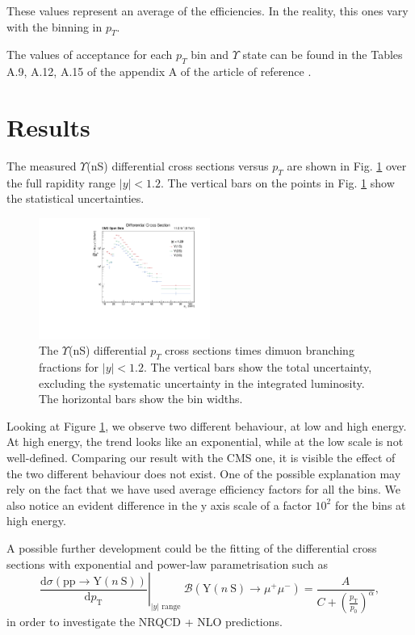 \documentclass[a4paper,11pt]{article}
\begin{document}
These values represent an average of the efficiencies. In the reality, this ones vary with the binning in $p_T$.

The values of acceptance for each $p_T$ bin and $\Upsilon$ state can be found in the Tables A.9, A.12, A.15 of the appendix A of the article of reference \cite{Khachatryan_2015}.

\section{Results}
The measured $\Upsilon$(nS) differential cross sections versus $p_T$ are shown in Fig. \ref{fig:diffcrosssec} over the full rapidity range $|y| < 1.2$. The vertical bars on the points in Fig. \ref{fig:diffcrosssec} show the statistical uncertainties.

\begin{figure}[h]
    \centering
    \includegraphics[width=0.5\textwidth]{diffCrossSection.pdf}
    \caption{The $\Upsilon$(nS) differential $p_T$ cross sections times dimuon branching fractions for $|y| < 1.2$. The vertical bars show the total uncertainty, excluding the systematic uncertainty in the integrated luminosity. The horizontal bars show the bin widths.}
    \label{fig:diffcrosssec}
\end{figure}

Looking at Figure \ref{fig:diffcrosssec}, we observe two different behaviour, at low and high energy. At high energy, the trend looks like an exponential, while at the low scale is not well-defined. 
Comparing our result with the CMS one\cite{Khachatryan_2015}, it is visible the effect of the two different behaviour does not exist. One of the possible explanation may rely on the fact that we have used average efficiency factors for all the bins.
We also notice an evident difference in the y axis scale of a factor $10^2$ for the bins at high energy. 

A possible further development could be the fitting of the differential cross sections with exponential and power-law parametrisation such as
\begin{equation}
    \left.\frac{\mathrm{d} \sigma(\mathrm{pp} \rightarrow \mathrm{Y}(n \mathrm{~S}))}{\mathrm{d} p_{\mathrm{T}}}\right|_{|y| \text { range }} \mathcal{B}\left(\mathrm{Y}(n \mathrm{~S}) \rightarrow \mu^{+} \mu^{-}\right)=\frac{A}{C+\left(\frac{p_{\mathrm{T}}}{p_0}\right)^\alpha},
\end{equation}
in order to investigate the NRQCD + NLO predictions.
\newpage
\end{document}
